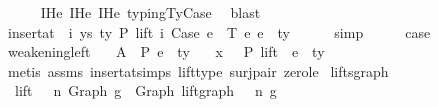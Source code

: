 \begin{isabellebody}
\ \ \ \ \isamarkupfalse%
\ IHe{}\ IHe{}\ IHe{}\ typing{\isachardot}{\kern0pt}TyCase\ \isamarkupfalse%
\ blast\isanewline
\ \ \isamarkupfalse%
\ \isamarkupfalse%
\ {\isachardoublequoteopen}insert{\isacharunderscore}{\kern0pt}at\ {\isasymGamma}\ i\ {\isacharparenleft}{\kern0pt}ys{\isacharcomma}{\kern0pt}\ ty{}{\isacharparenright}{\kern0pt}\ {\isasymturnstile}{\isacharbraceleft}{\kern0pt}P{\isacharbraceright}{\kern0pt}\ lift\ i\ {\isacharparenleft}{\kern0pt}Case\ e{}\ {\isasymGamma}{}\ T\ e{}\ e{}{\isacharparenright}{\kern0pt}\ {\isacharcolon}{\kern0pt}\ ty{}{\isacharprime}{\kern0pt}{\isachardoublequoteclose}\isanewline
\ \ \ \ \isamarkupfalse%
\ simp\isanewline
\ \ \isamarkupfalse%
\ \isamarkupfalse%
\ {\isacharquery}{\kern0pt}case\ \isakeywordONE{{\isachardot}{\kern0pt}}\isamarkupfalse%
\isanewline
{}\isamarkupfalse%
%
\endisatagproof
{\isafoldproof}%
%
\isadelimproof
\isanewline
%
\endisadelimproof
\isanewline
\isanewline
{}\isamarkupfalse%
\ weakening{\isacharunderscore}{\kern0pt}left{\isacharcolon}{\kern0pt}\isanewline
\ \ \ A{}{\isacharcolon}{\kern0pt}\ {\isachardoublequoteopen}{\isasymGamma}\ {\isasymturnstile}{\isacharbraceleft}{\kern0pt}P{\isacharbraceright}{\kern0pt}\ e\ {\isacharcolon}{\kern0pt}\ ty{\isachardoublequoteclose}\isanewline
\ \ \ {\isachardoublequoteopen}x\ {\isacharhash}{\kern0pt}\ {\isasymGamma}\ {\isasymturnstile}{\isacharbraceleft}{\kern0pt}P{\isacharbraceright}{\kern0pt}\ {\isacharparenleft}{\kern0pt}lift\ {}\ e{\isacharparenright}{\kern0pt}\ {\isacharcolon}{\kern0pt}\ ty{\isachardoublequoteclose}\isanewline
%
\isadelimproof
%
\endisadelimproof
%
\isatagproof
{}\isamarkupfalse%
\ {\isacharparenleft}{\kern0pt}metis\ assms\ insert{\isacharunderscore}{\kern0pt}at{\isachardot}{\kern0pt}simps{\isacharparenleft}{\kern0pt}{}{\isacharparenright}{\kern0pt}\ lift{\isacharunderscore}{\kern0pt}type\ surj{\isacharunderscore}{\kern0pt}pair\ zero{\isacharunderscore}{\kern0pt}le{\isacharparenright}{\kern0pt}%
\endisatagproof
{\isafoldproof}%
%
\isadelimproof
\isanewline
%
\endisadelimproof
\isanewline
\isanewline
{}\isamarkupfalse%
\ lifts{\isacharunderscore}{\kern0pt}graph{}{\isacharcolon}{\kern0pt}\isanewline
\ \ {\isachardoublequoteopen}{\isacharparenleft}{\kern0pt}lift\ {}\ {\isacharcircum}{\kern0pt}{\isacharcircum}{\kern0pt}\ n{\isacharparenright}{\kern0pt}\ {\isacharparenleft}{\kern0pt}Graph\ g{\isacharparenright}{\kern0pt}\ {\isacharequal}{\kern0pt}\ Graph\ {\isacharparenleft}{\kern0pt}{\isacharparenleft}{\kern0pt}lift{\isacharunderscore}{\kern0pt}graph\ {}\ {\isacharcircum}{\kern0pt}{\isacharcircum}{\kern0pt}\ n{\isacharparenright}{\kern0pt}\ g{\isacharparenright}{\kern0pt}{\isachardoublequoteclose}\isanewline

\end{isabellebody}
